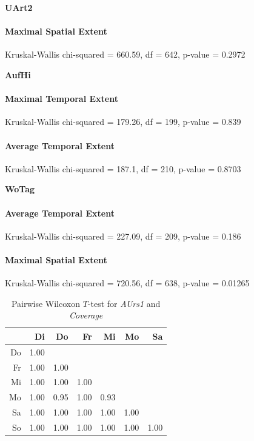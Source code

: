 \large
\centerline{\textbf{UArt2}}
\normalsize

\paragraph{Maximal Spatial Extent}
Kruskal-Wallis chi-squared = 660.59, df = 642, p-value = 0.2972

\large
\centerline{\textbf{AufHi}}
\normalsize

\paragraph{Maximal Temporal Extent}
Kruskal-Wallis chi-squared = 179.26, df = 199, p-value = 0.839
\paragraph{Average Temporal Extent}
Kruskal-Wallis chi-squared = 187.1, df = 210, p-value = 0.8703

\large
\centerline{\textbf{WoTag}}
\normalsize

\paragraph{Average Temporal Extent}
Kruskal-Wallis chi-squared = 227.09, df = 209, p-value = 0.186

\paragraph{Maximal Spatial Extent}
Kruskal-Wallis chi-squared = 720.56, df = 638, p-value = 0.01265
% 

  

\begin{table}[ht]
	\small
	\centering
	\begin{tabular}{rrrrrrr}
		\hline
	& Di & Do & Fr & Mi & Mo & Sa \\ 
		\hline
	Do & 1.00 &  &  &  &  &  \\ 
		Fr & 1.00 & 1.00 &  &  &  &  \\ 
		Mi & 1.00 & 1.00 & 1.00 &  &  &  \\ 
		Mo & 1.00 & 0.95 & 1.00 & 0.93 &  &  \\ 
		Sa & 1.00 & 1.00 & 1.00 & 1.00 & 1.00 &  \\ 
		So & 1.00 & 1.00 & 1.00 & 1.00 & 1.00 & 1.00 \\ 
		\hline
	  \end{tabular}
    \caption{Pairwise Wilcoxon $T$-test for \textit{AUrs1} and \textit{Coverage}}
    \label{tbl:wilcoxon_baysis_initiator_AUrs1_Cov}
\end{table}


